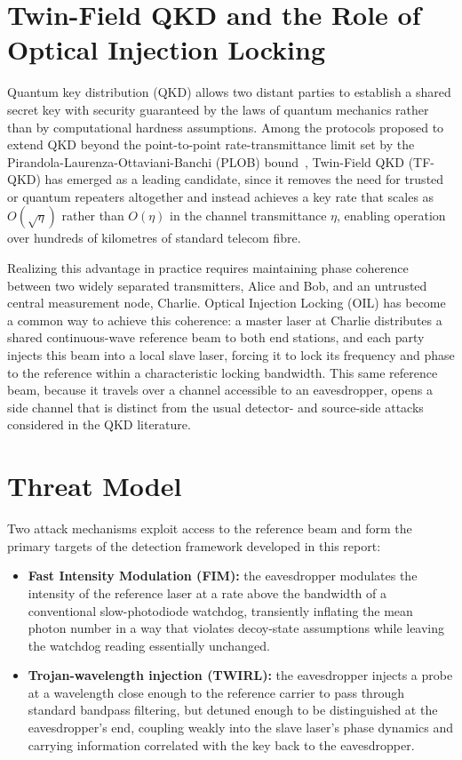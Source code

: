 \documentclass[12pt, a4paper]{report}
\begin{document}
\section{Twin-Field QKD and the Role of Optical Injection Locking}
Quantum key distribution (QKD) allows two distant parties to establish a shared secret key with security guaranteed by the laws of quantum mechanics rather than by computational hardness assumptions. Among the protocols proposed to extend QKD beyond the point-to-point rate-transmittance limit set by the Pirandola-Laurenza-Ottaviani-Banchi (PLOB) bound~\cite{pirandola2017fundamental}, Twin-Field QKD (TF-QKD) has emerged as a leading candidate, since it removes the need for trusted or quantum repeaters altogether and instead achieves a key rate that scales as $O(\sqrt{\eta})$ rather than $O(\eta)$ in the channel transmittance $\eta$, enabling operation over hundreds of kilometres of standard telecom fibre.

Realizing this advantage in practice requires maintaining phase coherence between two widely separated transmitters, Alice and Bob, and an untrusted central measurement node, Charlie. Optical Injection Locking (OIL) has become a common way to achieve this coherence: a master laser at Charlie distributes a shared continuous-wave reference beam to both end stations, and each party injects this beam into a local slave laser, forcing it to lock its frequency and phase to the reference within a characteristic locking bandwidth. This same reference beam, because it travels over a channel accessible to an eavesdropper, opens a side channel that is distinct from the usual detector- and source-side attacks considered in the QKD literature.

\section{Threat Model}
Two attack mechanisms exploit access to the reference beam and form the primary targets of the detection framework developed in this report:

\begin{itemize}
    \item \textbf{Fast Intensity Modulation (FIM):} the eavesdropper modulates the intensity of the reference laser at a rate above the bandwidth of a conventional slow-photodiode watchdog, transiently inflating the mean photon number in a way that violates decoy-state assumptions while leaving the watchdog reading essentially unchanged.
    \item \textbf{Trojan-wavelength injection (TWIRL):} the eavesdropper injects a probe at a wavelength close enough to the reference carrier to pass through standard bandpass filtering, but detuned enough to be distinguished at the eavesdropper's end, coupling weakly into the slave laser's phase dynamics and carrying information correlated with the key back to the eavesdropper.
\end{itemize}
\end{document}
